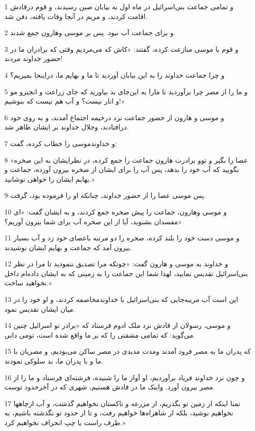 \par 1 و تمامی جماعت بنی‌اسرائیل در ماه اول به بیابان صین رسیدند، و قوم درقادش اقامت کردند، و مریم در آنجا وفات یافته، دفن شد.
\par 2 و برای جماعت آب نبود. پس بر موسی وهارون جمع شدند.
\par 3 و قوم با موسی منازعت کرده، گفتند: «کاش که می‌مردیم وقتی که برادران ما در حضور خداوند مردند!
\par 4 و چرا جماعت خداوند را به این بیابان آوردید تا ما و بهایم ما، دراینجا بمیریم؟
\par 5 و ما را از مصر چرا برآوردید تا مارا به این‌جای بد بیاورید که جای زراعت و انجیرو مو و انار نیست؟ و آب هم نیست که بنوشیم!»
\par 6 و موسی و هارون از حضور جماعت نزد درخیمه اجتماع آمدند، و به روی خود درافتادند، وجلال خداوند بر ایشان ظاهر شد.
\par 7 و خداوندموسی را خطاب کرده، گفت:
\par 8 «عصا را بگیر و توو برادرت هارون جماعت را جمع کرده، در نظرایشان به این صخره بگویید که آب خود را بدهد، پس آب را برای ایشان از صخره بیرون آورده، جماعت و بهایم ایشان را خواهی نوشانید.»
\par 9 پس موسی عصا را از حضور خداوند، چنانکه او را فرموده بود، گرفت.
\par 10 و موسی وهارون، جماعت را پیش صخره جمع کردند، و به ایشان گفت: «ای مفسدان بشنوید، آیا از این صخره آب برای شما بیرون آوریم؟»
\par 11 و موسی دست خود را بلند کرده، صخره را دو مرتبه باعصای خود زد و آب بسیار بیرون آمد که جماعت و بهایم ایشان نوشیدند.
\par 12 و خداوند به موسی و هارون گفت: «چونکه مرا تصدیق ننمودید تا مرا در نظر بنی‌اسرائیل تقدیس نمایید، لهذا شما این جماعت را به زمینی که به ایشان داده‌ام داخل نخواهید ساخت.»
\par 13 این است آب مریبه‌جایی که بنی‌اسرائیل با خداوندمخاصمه کردند، و او خود را در میان ایشان تقدیس نمود.
\par 14 و موسی، رسولان از قادش نزد ملک ادوم فرستاد که «برادر تو اسرائیل چنین می‌گوید: که تمامی مشقتی را که بر ما واقع شده است، تومی دانی.
\par 15 که پدران ما به مصر فرود آمدند ومدت مدیدی در مصر ساکن می‌بودیم، و مصریان با ما و با پدران ما، بد سلوکی نمودند.
\par 16 و چون نزد خداوند فریاد برآوردیم، او آواز ما را شنیده، فرشته‌ای فرستاد و ما را از مصر بیرون آورد. واینک ما در قادش هستیم، شهری که در آخرحدود توست.
\par 17 تمنا اینکه از زمین تو بگذریم، از مزرعه و تاکستان نخواهیم گذشت، و آب ازچاهها نخواهیم نوشید، بلکه از شاهراه‌ها خواهیم رفت، و تا از حدود تو نگذشته باشیم، به طرف راست یا چپ انحراف نخواهیم کرد.»
